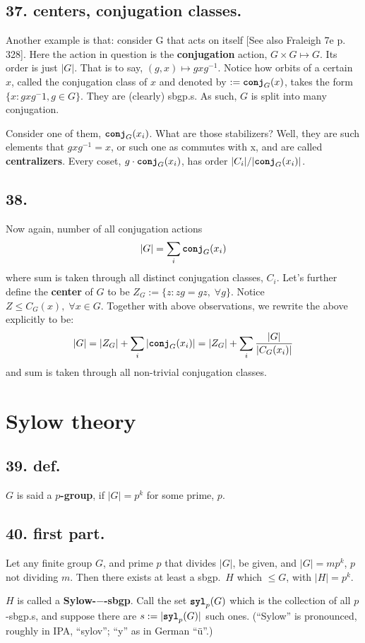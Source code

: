 \documentclass[12pt]{article}
\newcommand\F\frac%
\newcommand\M\cdot%
\newcommand\X\times%
\newcommand\Ev\forall%
\newcommand\Mp\mapsto%
\newcommand{\Ss}[1]{\textsf{\textbf{#1}}}%
\newcommand{\Tw}[1]{\texttt{\textbf{#1}}}%
\newcommand{\EqGo}[1]{ \begin{gather*}{#1}\end{gather*} } %
\begin{document}
\subsection*{37. centers, conjugation classes.} Another example is that: consider G that acts on itself [See also Fraleigh 7e p. 328]. 
Here the action in question is the \Ss{conjugation} action, \(G \X G \Mp G\). 
Its order is just \(|G|\). 
That is to say, \((g,x) \Mp gxg^{-1}\). 
Notice how orbits of a certain \(x\), called the conjugation class of \(x\) and denoted by \(:= \Tw{conj}_G (x)\), takes the form \(\{x: gxg^-1, g \in G\}\). 
They are (clearly) sbgp.s. 
As such, \(G\) is split into many conjugation. \par
Consider one of them, \(\Tw{conj}_G (x_i)\). What are those stabilizers? Well, they are such elements that \(gxg^{-1} = x\), or such one as commutes with x, and are called \Ss{centralizers}. 
Every coset, \(g \M \Tw{conj}_G (x_i)\), has order \(|C_i| / |\Tw{conj}_G (x_i)|\). 

\subsection*{38.} Now again, number of all conjugation actions \[
|G| = \sum_{i} \Tw{conj}_G (x_i)
\] where sum is taken through all distinct conjugation classes, \(C_i\). 
Let's further define the \Ss{center} of \(G\) to be \(Z_G := \{z: zg = gz,\; \Ev g \} \). 
Notice \(Z \leq C_G(x),\; \Ev x \in G\). 
Together with above observations, we rewrite the above explicitly to be: \EqGo{
 |G|
 = |Z_G| + \sum_{i} |\Tw{conj}_G (x_i)|
 = |Z_G| + \sum_{i} \F{|G|}{|C_G(x_i)|}
} and sum is taken through all non-trivial conjugation classes. 

\section{Sylow theory}
\subsection*{39. def.} \(G\) is said a \Ss{\(p\)-group}, if \( |G| = p^k \) for some prime, \(p\). \par

\subsection*{40. first part.} Let any finite group \(G\), and prime \(p\) that divides \(|G|\), be given, and \(|G| = mp^k\), \(p\) not dividing \(m\). 
Then there exists at least a sbgp.\ \(H\) which \(\leq G\), with \(|H| = p^k\). \par
\(H\) is called a \Ss{Sylow-\(-\)-sbgp}. Call the set \(\Tw{syl}_p(G)\) which is the collection of all \(p\)-sbgp.s, and suppose there are \(s:=|\Tw{syl}_p(G)|\) such ones. 
(``Sylow'' is pronounced, roughly in IPA, ``sylov''; ``y'' as in German ``\"u''.) \par
\end{document}
